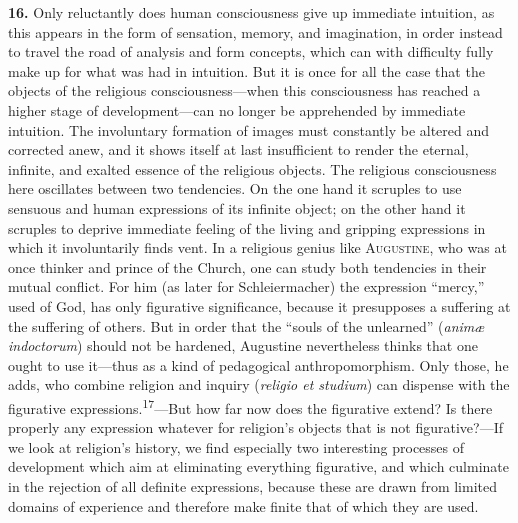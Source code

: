 \documentclass[12pt,a4paper]{book}
\newcommand{\opage}[1]{\marginnote{\footnotesize\textit{[#1]}}}
\begin{document}
\noindent\textbf{16.} Only reluctantly does human consciousness give up
immediate intuition, as this appears in the form of sensation, memory, and
imagination, in order instead to travel the road of analysis and form
concepts, which can with difficulty fully make up for what was had in
intuition. But 
\opage{41}it is once for all the case that the objects of the religious
consciousness---when this consciousness has reached a higher stage of
development---can no longer be apprehended by immediate intuition. The
involuntary formation of images must constantly be altered and corrected
anew, and it shows itself at last insufficient to render the eternal,
infinite, and exalted essence of the religious objects. The religious
consciousness here oscillates between two tendencies. On the one hand it
scruples to use sensuous and human expressions of its infinite object; on the
other hand it scruples to deprive immediate feeling of the living and gripping
expressions in which it involuntarily finds vent. In a religious genius like
\textsc{Augustine}, who was at once thinker and prince of the Church, one can
study both tendencies in their mutual conflict. For him (as later for
Schleiermacher) the expression ``mercy,'' used of God, has only figurative
significance, because it presupposes a suffering at the suffering of others.
But in order that the ``souls of the unlearned'' (\textit{animæ indoctorum})
should not be hardened, Augustine nevertheless thinks that one ought to use
it---thus as a kind of pedagogical anthropomorphism. Only those, he adds, who
combine religion and inquiry (\textit{religio et studium}) can dispense with
the figurative expressions.\textsuperscript{17}---But how far now does the
figurative extend? Is there properly any expression whatever for religion's
objects that is not figurative?---If we look at religion's history, we find
especially two interesting processes of development which aim at eliminating
everything figurative, and which culminate in the rejection of all definite
expressions, because these are drawn from limited domains of experience and
therefore make finite that of which they are used.
\end{document}
